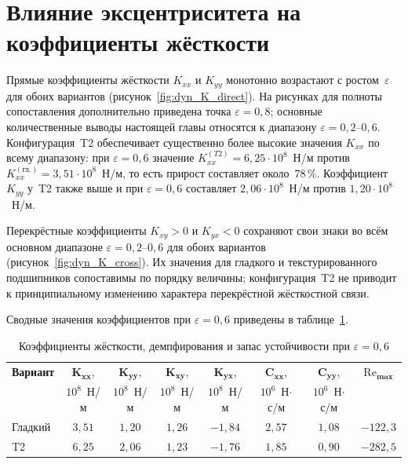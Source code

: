 \section{Влияние эксцентриситета на коэффициенты жёсткости}

Прямые коэффициенты жёсткости $K_{xx}$ и $K_{yy}$ монотонно
возрастают с ростом~$\varepsilon$ для обоих вариантов
(рисунок~\ref{fig:dyn_K_direct}). На рисунках для полноты
сопоставления дополнительно приведена точка
$\varepsilon = 0{,}8$; основные количественные выводы настоящей
главы относятся к диапазону
$\varepsilon = 0{,}2$--$0{,}6$. Конфигурация~T2 обеспечивает
существенно более высокие значения $K_{xx}$ по всему диапазону:
при $\varepsilon = 0{,}6$ значение
$K_{xx}^{(T2)} = 6{,}25 \cdot 10^8$~Н/м против
$K_{xx}^{(\text{гл.})} = 3{,}51 \cdot 10^8$~Н/м, то есть
прирост составляет около~$78\,\%$. Коэффициент $K_{yy}$ у~T2
также выше и при $\varepsilon = 0{,}6$ составляет
$2{,}06 \cdot 10^8$~Н/м против $1{,}20 \cdot 10^8$~Н/м.

Перекрёстные коэффициенты $K_{xy} > 0$ и $K_{yx} < 0$
сохраняют свои знаки во всём основном диапазоне
$\varepsilon = 0{,}2$--$0{,}6$ для обоих вариантов
(рисунок~\ref{fig:dyn_K_cross}). Их значения для гладкого
и текстурированного подшипников сопоставимы по порядку величины;
конфигурация~T2 не приводит к принципиальному изменению характера
перекрёстной жёсткостной связи.

Сводные значения коэффициентов при $\varepsilon = 0{,}6$
приведены в таблице~\ref{tab:dyn_coeffs}.

\begin{table}[!ht]
\centering
\caption{Коэффициенты жёсткости, демпфирования и запас
  устойчивости при $\varepsilon = 0{,}6$}
\label{tab:dyn_coeffs}
\small
\begin{tabular}{|l|c|c|c|c|c|c|c|}
\hline
\textbf{Вариант}
  & $\boldsymbol{K_{xx}}$, & $\boldsymbol{K_{yy}}$,
  & $\boldsymbol{K_{xy}}$, & $\boldsymbol{K_{yx}}$,
  & $\boldsymbol{C_{xx}}$, & $\boldsymbol{C_{yy}}$,
  & $\boldsymbol{\mathrm{Re}_{\max}}$ \\
  & $10^8$~Н/м & $10^8$~Н/м
  & $10^8$~Н/м & $10^8$~Н/м
  & $10^6$~Н$\cdot$с/м & $10^6$~Н$\cdot$с/м
  & \\
\hline
Гладкий
  & $3{,}51$ & $1{,}20$ & $1{,}26$ & $-1{,}84$
  & $2{,}57$ & $1{,}08$
  & $-122{,}3$ \\
\hline
T2
  & $6{,}25$ & $2{,}06$ & $1{,}23$ & $-1{,}76$
  & $1{,}85$ & $0{,}90$
  & $-282{,}5$ \\
\hline
\end{tabular}
\end{table}

